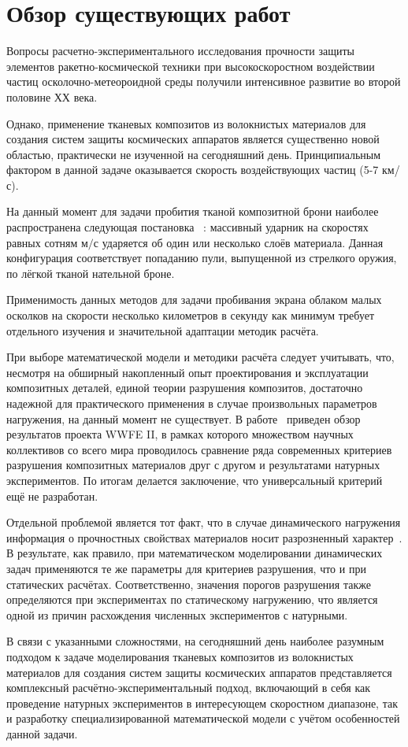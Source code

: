 \chapter{Обзор существующих работ}\label{ch:overview}

Вопросы расчетно-экспериментального исследования прочности защиты элементов ракетно-космической техники при
высокоскоростном воздействии частиц осколочно-метеороидной среды получили интенсивное развитие во второй
половине ХХ века.

Однако, применение тканевых композитов из волокнистых материалов для создания систем защиты космических аппаратов
является существенно новой областью, практически не изученной на сегодняшний день.
Принципиальным фактором в данной задаче оказывается скорость воздействующих частиц (5-7 км/с).

На данный момент для задачи пробития тканой композитной брони наиболее распространена следующая постановка
~\cite{kobylkin2014,kharchenko,walker1999,walker2001,porval,bkhatnagar}:
массивный ударник на скоростях равных сотням $м/с$ ударяется об один или несколько слоёв материала.
Данная конфигурация соответствует попаданию пули, выпущенной из стрелкого оружия, по лёгкой тканой нательной броне.

Применимость данных методов для задачи пробивания экрана облаком малых осколков на скорости несколько километров в
секунду как минимум  требует отдельного изучения и значительной адаптации методик расчёта.

При выборе математической модели и методики расчёта следует  учитывать, что, несмотря на обширный накопленный опыт
проектирования и  эксплуатации композитных деталей, единой теории разрушения композитов,  достаточно надежной для
практического применения в случае произвольных  параметров нагружения, на данный момент не существует.
В работе~\cite{kaddour} приведен обзор результатов проекта WWFE II, в рамках которого  множеством научных коллективов со всего
мира проводилось сравнение ряда  современных критериев разрушения композитных материалов друг с  другом и результатами
натурных экспериментов.
По итогам делается  заключение, что универсальный критерий ещё не разработан.

Отдельной проблемой является тот факт, что в случае динамического  нагружения информация о прочностных свойствах
материалов носит разрозненный характер~\cite{kobylkin2014}.
В результате, как правило, при математическом моделировании динамических задач применяются те же параметры для
критериев разрушения, что и при статических расчётах.
Соответственно, значения порогов разрушения также определяются при экспериментах по  статическому нагружению, что
является одной из причин расхождения численных экспериментов с натурными.

В связи с указанными сложностями, на сегодняшний день наиболее разумным подходом к задаче моделирования тканевых
композитов из волокнистых материалов для создания систем защиты космических аппаратов представляется комплексный
расчётно-экспериментальный подход, включающий в себя как проведение натурных экспериментов в интересующем скоростном
диапазоне, так и разработку специализированной математической модели с учётом особенностей данной задачи.
